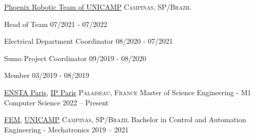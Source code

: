 \documentclass[10pt, a4paper]{article}
\begin{document}
\headedsection
    {\href{}{Phoenix Robotic Team of UNICAMP}}
    {\textsc{Campinas, SP/Brazil}}
    {
        \headedsubsection
        {Head of Team}
        {07/2021 - 07/2022}
        {\bodytext{}}

        \headedsubsection
        {Electrical Department Coordinator}
        {08/2020 - 07/2021}
        {\bodytext{}}

        \headedsubsection
        {Sumo Project Coordinator}
        {09/2019 - 08/2020}
        {\bodytext{}}
        
        \headedsubsection
        {Member}
        {03/2019 - 08/2019}
        {\bodytext{}}
    }

\spacedhrule{-0.2em}{-0.4em}



\headedsection
    {\href{}{ENSTA Paris}, \href{}{IP Paris}}
    {\textsc{Palaiseau, France}}
    {
     \headedsubsection
        {Master of Science Engineering - M1 Computer Science}
        {2022 -- Present}
        {}
    }

\headedsection
    {\href{}{FEM}, \href{}{UNICAMP}}
    {\textsc{Campinas, SP/Brazil}}
    {
     \headedsubsection
        {Bachelor in Control and Automation Engineering - Mechatronics}
        {2019 -- 2021}
        {}
    }

\spacedhrule{0.5em}{-0.4em}


\vspace{-1.3em}
\end{document}
